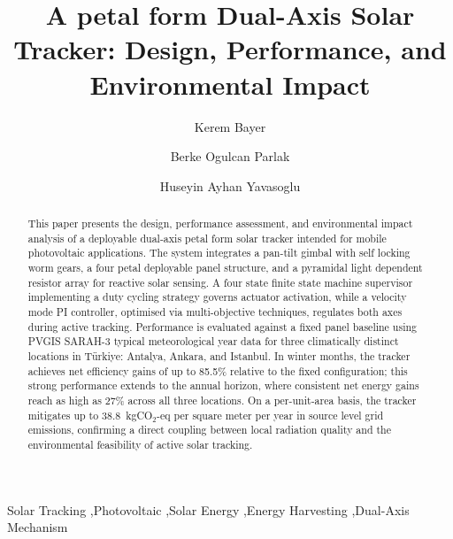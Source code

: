 \documentclass[preprint,3p,12pt]{elsarticle}
\def\corref#1{}%
\begin{document}

\begin{frontmatter}

\title{A petal form Dual-Axis Solar Tracker: Design, Performance,
and Environmental Impact}

\author{Kerem Bayer}

\author{Berke Ogulcan Parlak}

\author{Huseyin Ayhan Yavasoglu\corref{}}



\begin{abstract}
This paper presents the design, performance assessment, and
environmental impact analysis of a deployable dual-axis petal form
solar tracker intended for mobile photovoltaic applications. The
system integrates a pan-tilt gimbal with self locking worm gears, a
four petal deployable panel structure, and a pyramidal
light dependent resistor array for reactive solar sensing. A
four state finite state machine supervisor implementing a
 duty cycling strategy governs actuator activation,
while a velocity mode PI controller, optimised via multi-objective techniques, regulates both axes during active tracking. Performance is evaluated against a fixed panel baseline using PVGIS SARAH-3 typical meteorological year data for three climatically distinct locations in Türkiye: Antalya, Ankara, and Istanbul. In winter months, the tracker achieves net efficiency gains of up to 85.5\% relative to the fixed configuration; this strong performance extends to the annual horizon, where consistent net energy gains reach as high as 27\% across all three locations. On a per-unit-area basis,
the tracker mitigates up to 38.8~kgCO$_2$-eq per square meter per
year in source level grid emissions, confirming a direct coupling
between local radiation quality and the environmental feasibility of
active solar tracking.
\end{abstract}

\begin{keyword}
Solar Tracking \sep Photovoltaic \sep Solar Energy \sep Energy Harvesting \sep Dual-Axis Mechanism
\end{keyword}

\end{frontmatter}
\end{document}
